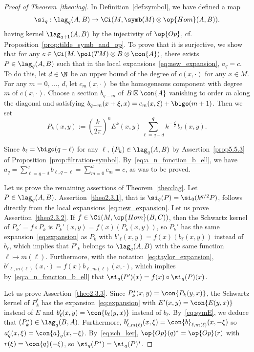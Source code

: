 \begin{proof}[Proof of Theorem~\ref{theo:lag}]
In Definition~\ref{def:symbol}, we have defined a map
\[
\si_q : \lag_q(A,B) \rightarrow \Ci (M, \symb (M) \otimes \op{Hom}
(A,B)).
\]
having kernel $\lag_{q+1} (A,B)$ by  the injectivity of $\op{Op}$, cf. Proposition~\ref{prop:tilde_symb_and_op}.  To prove that it is surjective, we show that for any $c \in \Ci (M, \pol (TM) \otimes B \otimes \con{A})$, there exists $P \in \lag_q (A,B)$ such that in the local expansions~\eqref{eq:new_expansion}, $a_q =c$. To do this, let $d \in \N$  be an upper bound of the degree of $c(x, \cdot)$ for any $x\in M$. For any  $m =0, \,\ldots,\, d$,  let $c_m(x,\cdot)$ be the homogeneous component with degree $m$ of $c(x, \cdot)$. Choose a section $b_{q-m}$ of $B \boxtimes
\con{A}$ vanishing to order $m$ along the diagonal and satisfying $b_{q-m} (x+ \xi, x) = c_m (x,\xi) + \bigo (m+1)$. Then we set 
\[
P_k (x,y) := \left(\frac{k}{2\pi} \right)^n E^k(x,y) \sum_{\ell = q-
d }^q k^{-
\frac{\ell}{2}} b_{\ell} (x,y).
\]

Since $b_\ell = \bigo (q-\ell)$ for any $\ell$, $(P_k) \in \lag_q (A,B)$ by Assertion~\eqref{prop5.5.3} of Proposition~\ref{prop:filtration-symbol}.  By~\eqref{eq:a_n_fonction_b_ell}, we have $a_q =  \sum_{\ell = q-d}^q b_{\ell, q- \ell} = \sum_{m=0}^{d} c_{m}  = c$, as was to be proved.

Let us prove the remaining assertions of Theorem~\ref{theo:lag}. Let $P \in \lag_q (A,B)$. Assertion~\eqref{theo2.3.1}, that is $\si _q (P) = \si_0 (k^{q/2} P)$, follows directly from the local expansions~\eqref{eq:new_expansion}. Let us prove Assertion~\eqref{theo2.3.2}. If $f \in \Ci (M,
\op{Hom} (B,C))$, then the Schwartz kernel of $ P_k'= f \circ P_k$ is $P_k' (x,y) = f(x) (P_k (x,y))$, so $P_k'$ has the same expansion~\eqref{eq:expansion} as $P_k$ with $b'_{\ell} (x,y) = f(x)(b_{\ell}(x,y))$ instead of $b_{\ell}$, which implies that $P'_k$ belongs to $\lag_q (A,B)$ with the same function $\ell \mapsto m(\ell) $. Furthermore, with the notation~\eqref{eq:taylor_expansion}, $b'_{\ell, m(\ell)} (x, \cdot) = f(x) b_{\ell, m(\ell)} (x, \cdot)$, which implies by~\eqref{eq:a_n_fonction_b_ell} that $\si_q(P')(x) = f(x) \circ \si_q(P)(x)$.

Let us prove Assertion~\eqref{theo2.3.3}. Since $P_k^* (x,y) = \con{P_k (y,x)}$, the Schwartz kernel of $P_k^*$ has the expansion~\eqref{eq:expansion} with $E' (x,y) =
\con{E (y,x)}$ instead of $E$ and $b'_{\ell} (x,y) = \con{b_{\ell} (y,x)}$ instead of $b_{\ell}$. By~\eqref{eq:symE}, we deduce that $(P_k^*) \in \lag_q (B,A)$. Furthermore, $b'_{\ell, m(\ell)} (x, \xi) = \con{b}_{\ell,m(\ell)}(x, - \xi)$ so $a_q' (x,\xi) = \con{a}_q (x, -\xi)$. By~\eqref{eq:sch_ker}, $\op{Op} (q)^* = \op{Op} (r)$ with $r(\xi) = \con{q} (- \xi)$, so $\si_q(P^*) = \si_q(P)^*$.


\end{proof}
